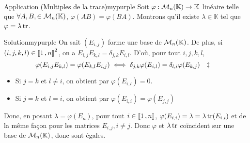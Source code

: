     \begin{omed}{Application \textcolor{black}{(Multiples de la trace)}}{mypurple}
        Soit $\varphi : \mathcal{M}_{n}(\mathbb{K}) \to \mathbb{K}$ linéaire telle que $\forall A,B, \in \mathcal{M}_{n}(\mathbb{K})$, $\varphi(AB) = \varphi(BA)$. Montrons qu’il existe $\lambda \in \mathbb{K}$ tel que $\varphi = \lambda \operatorname{tr}$.
    \end{omed}

    \begin{demo}{Solution}{mypurple}
        On sait $(E_{i,j})$ forme une base de $\mathcal{M}_{n}(\mathbb{K})$. De plus, si $(i,j,k,l) \in \left\llbracket 1 \, , n \right\rrbracket^2$, on a $E_{i,j} E_{k,l} = \delta_{j,k}E_{i,l}$. D’où, pour tout $i,j,k,l$, 
        \[ \varphi(E_{i,j} E_{k,l}) = \varphi(E_{k,l} E_{i,j}) \iff \delta_{j,k} \varphi(E_{i,l}) = \delta_{l,i} \varphi(E_{k,j}) \esp{\textdaggerdbl} \]   
        \begin{itemize}
            \item Si $j=k$ et $l \neq i$, on obtient par \textdaggerdbl $\varphi(E_{i,l}) = 0$.
            \item Si $j=k$ et $l = i$, on obtient par \textdaggerdbl $\varphi(E_{i,i}) = \varphi(E_{j,j})$
        \end{itemize}
        Donc, en posant $\lambda = \varphi(E_n)$, pour tout $i \in \left\llbracket 1 \, , n \right\rrbracket$, $\varphi(E_{i,i}) = \lambda = \lambda \operatorname{tr}(E_{i,i})$ et de la même façon pour les matrices $E_{i,j}, i \neq j$. Donc $\varphi$ et $\lambda \operatorname{tr}$ coïncident sur une base de $\mathcal{M}_{n}(\mathbb{K})$, donc sont égales.
    \end{demo}

